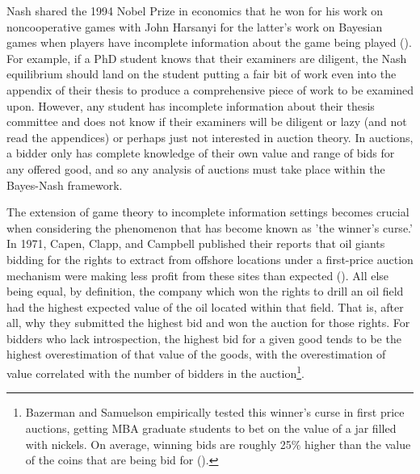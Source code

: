 Nash shared the 1994 Nobel Prize in economics that he won for his work on noncooperative games with John Harsanyi for the latter's work on Bayesian games when players have incomplete information about the game being played (\cite{harsanyi1997games}). For example, if a PhD student knows that their examiners are diligent, the Nash equilibrium should land on the student putting a fair bit of work even into the appendix of their thesis to produce a comprehensive piece of work to be examined upon. However, any student has incomplete information about their thesis committee and does not know if their examiners will be diligent or lazy (and not read the appendices) or perhaps just not interested in auction theory. In auctions, a bidder only has complete knowledge of their own value and range of bids for any offered good, and so any analysis of auctions must take place within the Bayes-Nash framework.

The extension of game theory to incomplete information settings becomes crucial when considering the phenomenon that has become known as 'the winner's curse.' In 1971, Capen, Clapp, and Campbell published their reports that oil giants bidding for the rights to extract from offshore locations under a first-price auction mechanism were making less profit from these sites than expected (\cite{capenCompetitiveBiddingHighRisk1971}). All else being equal, by definition, the company which won the rights to drill an oil field had the highest expected value of the oil located within that field. That is, after all, why they submitted the highest bid and won the auction for those rights. For bidders who lack introspection, the highest bid for a given good tends to be the highest overestimation of that value of the goods, with the overestimation of value correlated with the number of bidders in the auction\footnote{Bazerman and Samuelson empirically tested this winner’s curse in first price auctions, getting MBA graduate students to bet on the value of a jar filled with nickels. On average, winning bids are roughly 25\% higher than the value of the coins that are being bid for (\cite{bazermanWonAuctionDont1983}).}.

